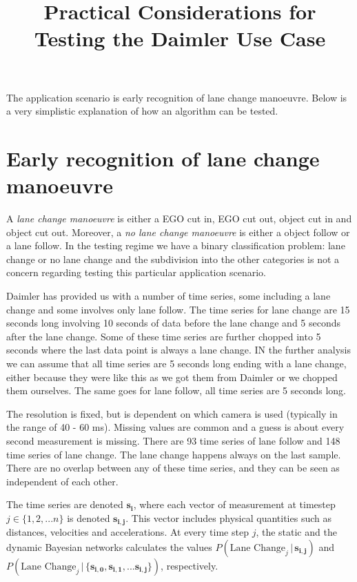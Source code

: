 \documentclass{article}
\title{Practical Considerations for Testing the Daimler Use Case}
\date{}
\theoremstyle{theorem}
\theoremstyle{definition}
\newcommand{\bu}[1]{\mathbf{#1}}
\newcommand{\bv}[1]{\bm{#1}}
\begin{document}
\maketitle

The application scenario is early recognition of lane change manoeuvre.  Below is a very simplistic explanation of how an algorithm can be tested. 

\section{Early recognition of lane change manoeuvre}

A \emph{lane change manoeuvre} is either a EGO cut in, EGO cut out, object cut in and object cut out. Moreover, a \emph{no lane change manoeuvre} is either a object follow or a lane follow.  In the testing regime we have a binary classification problem: lane change or no lane change and the subdivision into the other categories is not a concern regarding testing this particular application scenario.

Daimler has provided us with a number of time series, some including a lane change and some involves only lane follow. The time series for lane change are 15 seconds long involving 10 seconds of data before the lane change and 5 seconds after the lane change. Some of these time series are further chopped into 5 seconds where the last data point is always a lane change. IN the further analysis we can assume that all time series are 5 seconds long ending with a lane change, either because they were like this as we got them from Daimler or we chopped them ourselves. The same goes for lane follow, all time series are 5 seconds long.

The resolution is fixed, but is dependent on which camera is used (typically in the range of 40 - 60 ms).  Missing values are common and a guess is about every second measurement is missing.  There are 93 time series of lane follow and 148 time series of lane change.  The lane change happens always on the last sample. There are no overlap between any of these time series, and they can be seen as independent of each other.

The time series are denoted $\bu{s_i}$, where each vector of measurement at timestep $j \in \{1,2, ... n\}$ is denoted $\bv{s_{i,j}}$. This vector includes physical quantities such as distances, velocities and accelerations.  At every time step $j$, the static and the dynamic Bayesian networks calculates the values  $P(\mbox{Lane Change}_j \,|\,  \bv{s_{i,j}})$ and \\
$P(\mbox{Lane Change}_j \,|\, \{ \bv{s_{i,0}}, \bv{s_{i,1}}, ... \bv{s_{i,j}} \})$, respectively.
\end{document}
